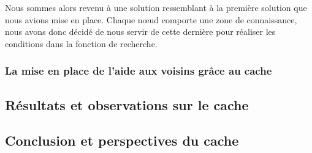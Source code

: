 \par Nous sommes alors revenu à une solution ressemblant à la première solution que nous avions mise en place. Chaque nœud comporte une zone de connaissance, nous avons donc décidé de nous servir de cette dernière pour réaliser les conditions dans la fonction de recherche.


\subsubsection{La mise en place de l'aide aux voisins grâce au cache}


\subsection{Résultats et observations sur le cache}
\label{resObsCache}

\subsection{Conclusion et perspectives du cache} 



